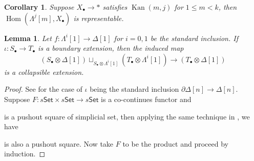 \documentclass[12pt]{amsart}
\newtheorem{cor}[thm]{Corollary}
\newtheorem{lem}[thm]{Lemma}
\theoremstyle{definition}
\theoremstyle{remark}
\numberwithin{equation}{section}
\newcommand{\del}{\partial}
\renewcommand{\del}{\partial}
\newcommand{\1}{{\mathbb{1}}}
\newcommand{\set}{\mathsf{Set}}
\newcommand{\bt}{\bullet}
\newcommand{\Hom}{\operatorname{Hom}}
\newcommand{\kan}{\operatorname{Kan}}
\begin{document}
\begin{cor}
    Suppose $X_{\bt}\to *$ satisfies $\kan(m, j)$ for $1 \le m <k$, then $\Hom(\Lambda^j[m], X_{\bt})$ is representable.
\end{cor}

\begin{lem}
    Let $f: \Lambda^i[1] \to \Delta[1]$ for $i= 0, 1$ be the standard inclusion. If $\iota: S_{\bt}\to T_{\bt}$ is a boundary extension, then the induced map
    $$
    (S_{\bt} \otimes \Delta[1]) \sqcup_{S_{\bt} \otimes \Lambda^i[1] }(T_{\bt} \otimes \Lambda^i[1]) \to (T_{\bt} \otimes \Delta[1])
    $$
    is a collapsible extension.
\end{lem}
\begin{proof}
    See \cite[Lemma 3.3.3]{Hov07} for the case of $\iota$ being the standard inclusion $\del \Delta[n] \to \Delta[n]$. Suppose $F:s\set \times s\set \to s\set$  is a co-continues functor and 
    
\begin{center}
\end{center}
is a pushout square of simplicial set, then applying the same technique in \cite[Lemma 2.42]{Li15}, we have
\begin{center}
\end{center}
is also a pushout square. Now take $F$ to be the product and proceed by induction.
\end{proof}
\end{document}
